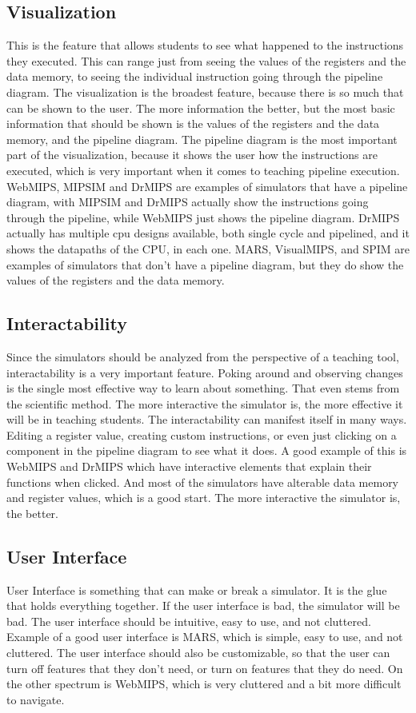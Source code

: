 \subsection{Visualization}\label{sec:instruction_visualization}
This is the feature that allows students to see what happened to the instructions they executed. This can range just from seeing the values of the registers and the data memory, to seeing the individual instruction going through the pipeline diagram. The visualization is the broadest feature, because there is so much that can be shown to the user. The more information the better, but the most basic information that should be shown is the values of the registers and the data memory, and the pipeline diagram. The pipeline diagram is the most important part of the visualization, because it shows the user how the instructions are executed, which is very important when it comes to teaching pipeline execution. WebMIPS, MIPSIM and DrMIPS are examples of simulators that have a pipeline diagram, with MIPSIM and DrMIPS actually show the instructions going through the pipeline, while WebMIPS just shows the pipeline diagram. DrMIPS actually has multiple cpu designs available, both single cycle and pipelined, and it shows the datapaths of the CPU, in each one. MARS, VisualMIPS, and SPIM are examples of simulators that don't have a pipeline diagram, but they do show the values of the registers and the data memory.

\subsection{Interactability}\label{sec:interactability}
Since the simulators should be analyzed from the perspective of a teaching tool, interactability is a very important feature. Poking around and observing changes is the single most effective way to learn about something. That even stems from the scientific method. The more interactive the simulator is, the more effective it will be in teaching students. The interactability can manifest itself in many ways. Editing a register value, creating custom instructions, or even just clicking on a component in the pipeline diagram to see what it does. A good example of this is WebMIPS and DrMIPS which have interactive elements that explain their functions when clicked. And most of the simulators have alterable data memory and register values, which is a good start. The more interactive the simulator is, the better.

\subsection{User Interface}\label{sec:user_interface}
User Interface is something that can make or break a simulator. It is the glue that holds everything together. If the user interface is bad, the simulator will be bad. The user interface should be intuitive, easy to use, and not cluttered. Example of a good user interface is MARS, which is simple, easy to use, and not cluttered. The user interface should also be customizable, so that the user can turn off features that they don't need, or turn on features that they do need. On the other spectrum is WebMIPS, which is very cluttered and a bit more difficult to navigate. 

